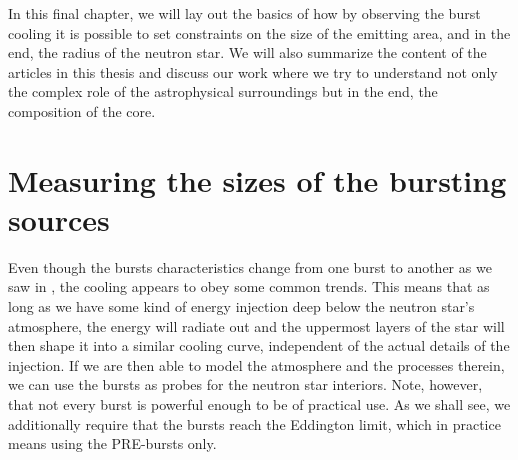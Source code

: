 In this final chapter, we will lay out the basics of how by observing the burst cooling it is possible to set constraints on the size of the emitting area, and in the end, the radius of the neutron star.
We will also summarize the content of the articles in this thesis and discuss our work where we try to understand not only the complex role of the astrophysical surroundings but in the end, the composition of the core.


\section{Measuring the sizes of the bursting sources}

Even though the bursts characteristics change from one burst to another as we saw in , the cooling appears to obey some common trends.
This means that as long as we have some kind of  energy injection deep below the neutron star's atmosphere, the energy will radiate out and the uppermost layers of the star will then shape it into a similar cooling curve, independent of the actual details of the injection.
If we are then able to model the atmosphere and the processes therein, we can use the bursts as probes for the neutron star interiors.
Note, however, that not every burst is powerful enough to be of practical use.
As we shall see, we additionally require that the bursts reach the Eddington limit, which in practice means using the PRE-bursts only.


